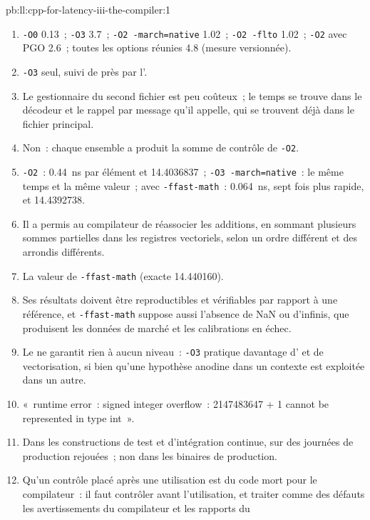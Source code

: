 \begin{solution}{pb:ll:cpp-for-latency-iii-the-compiler:1}
\begin{enumerate} \sloppy
\item \texttt{-O0} 0.13~; \texttt{-O3} 3.7~; \texttt{-O2 -march=native} 1.02~; \texttt{-O2 -flto} 1.02~; \texttt{-O2} avec
PGO 2.6~; toutes les options réunies 4.8 (mesure versionnée).
\item \texttt{-O3} seul, suivi de près par l'.
\item Le gestionnaire du second fichier est peu coûteux~; le temps se trouve dans le décodeur et le rappel par message qu'il appelle, qui
se trouvent déjà dans le fichier principal.
\item Non~: chaque ensemble a produit la somme de contrôle de \texttt{-O2}.
\item \texttt{-O2}~: \qty{0.44}{\nano\second} par élément et 14.4036837~; \texttt{-O3 -march=native}~: le même temps et
la même valeur~; avec \texttt{-ffast-math}~: \qty{0.064}{\nano\second}, sept fois plus rapide, et 14.4392738.
\item Il a permis au compilateur de réassocier les additions, en sommant plusieurs sommes partielles dans les registres vectoriels, selon un
ordre différent et des arrondis différents.
\item La valeur de \texttt{-ffast-math} (exacte 14.440160).
\item Ses résultats doivent être reproductibles et vérifiables par rapport à une référence, et \texttt{-ffast-math} suppose aussi l'absence de NaN ou
d'infinis, que produisent les données de marché et les calibrations en échec.
\item Le  ne garantit rien à aucun niveau~: \texttt{-O3} pratique davantage d' et de vectorisation, si bien qu'une hypothèse
anodine dans un contexte est exploitée dans un autre.
\item «~runtime error~: signed integer overflow~: 2147483647 + 1 cannot be represented in type int~».
\item Dans les constructions de test et d'intégration continue, sur des journées de production rejouées~; non dans les binaires de production.
\item Qu'un contrôle placé après une utilisation est du code mort pour le compilateur~: il faut contrôler avant l'utilisation, et traiter comme des défauts les avertissements du compilateur et les rapports du

\end{enumerate}
\end{solution}
